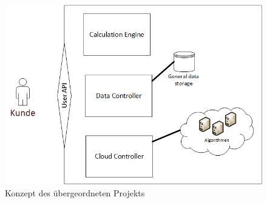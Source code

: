 \begin{figure}[h]
\centering
\includegraphics[scale=0.8]{images/visio/ausblick.png}
\caption[Konzept des übergeordneten Projekts]{Konzept des übergeordneten Projekts \selfmade{}}
\label{fig:ausblick}
\end{figure}
